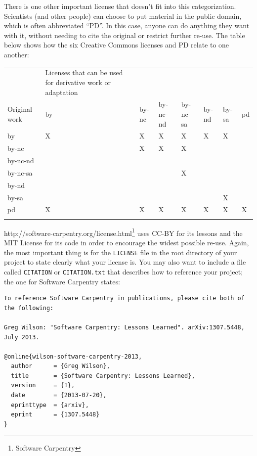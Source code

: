\documentclass[]{book}
\newcommand{\urlfoot}[2]{{#1}\footnote{#2}}
\begin{document}
There is one other important license that doesn't fit into this
categorization. Scientists (and other people) can choose to put material
in the public domain, which is often abbreviated ``PD''. In this case,
anyone can do anything they want with it, without needing to cite the
original or restrict further re-use. The table below shows how the six
Creative Commons licenses and PD relate to one another:

\begin{longtable}[c]{@{}llllllll@{}}
\hline\noalign{\medskip}
& Licenses that can be used for derivative work or adaptation
\\\noalign{\medskip}
Original work & by & by-nc & by-nc-nd & by-nc-sa & by-nd & by-sa & pd
\\\noalign{\medskip}
by & X & X & X & X & X & X &
\\\noalign{\medskip}
by-nc & & X & X & X & & &
\\\noalign{\medskip}
by-nc-nd & & & & & & &
\\\noalign{\medskip}
by-nc-sa & & & & X & & &
\\\noalign{\medskip}
by-nd & & & & & & &
\\\noalign{\medskip}
by-sa & & & & & & X &
\\\noalign{\medskip}
pd & X & X & X & X & X & X & X
\\\noalign{\medskip}
\hline
\end{longtable}

\urlfoot{http://software-carpentry.org/license.html}{Software Carpentry}
uses CC-BY for its lessons and the MIT License for its code in order to
encourage the widest possible re-use. Again, the most important thing is
for the \texttt{LICENSE} file in the root directory of your project to
state clearly what your license is. You may also want to include a file
called \texttt{CITATION} or \texttt{CITATION.txt} that describes how to
reference your project; the one for Software Carpentry states:

\begin{verbatim}
To reference Software Carpentry in publications, please cite both of the following:

Greg Wilson: "Software Carpentry: Lessons Learned". arXiv:1307.5448, July 2013.

@online{wilson-software-carpentry-2013,
  author      = {Greg Wilson},
  title       = {Software Carpentry: Lessons Learned},
  version     = {1},
  date        = {2013-07-20},
  eprinttype  = {arxiv},
  eprint      = {1307.5448}
}
\end{verbatim}
\end{document}
